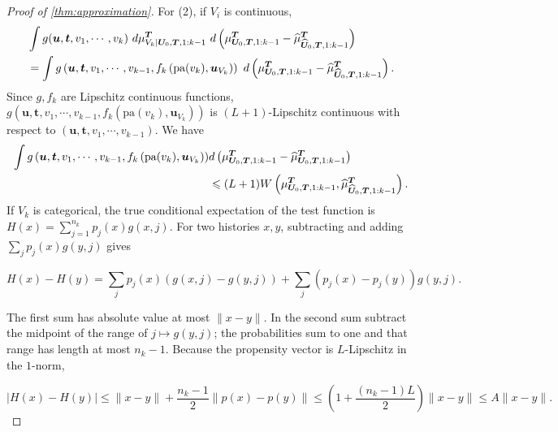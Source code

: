 \begin{proof}[Proof of \cref{thm:approximation}]
  For (2), if $V_i$ is continuous, 
  \begin{align}
   & \int g(\boldsymbol{u} ,\boldsymbol{t} ,v_{1} ,\cdots ,v_{k}) \ d\mu _{V_{k} |\boldsymbol{U}_0 ,\boldsymbol{T} ,1:k-1}^{\boldsymbol{T}} \ d\left( \mu _{\boldsymbol{U}_0 ,\boldsymbol{T} ,1:k-1}^{\boldsymbol{T}} -\hat{\mu }_{\hat{\boldsymbol{U}}_0 ,\boldsymbol{T} ,1:k-1}^{\boldsymbol{T}}\right)\notag\\
   & =\int g\left(\boldsymbol{u} ,\boldsymbol{t} ,v_{1} ,\cdots ,v_{k-1} ,{f}_{k}\left(\text{pa}( v_{k}) ,\boldsymbol{u}_{V_{k}}\right)\right) \ d\left( \mu _{\boldsymbol{U}_0 ,\boldsymbol{T} ,1:k-1}^{\boldsymbol{T}} -\hat{\mu }_{\hat{\boldsymbol{U}}_0 ,\boldsymbol{T} ,1:k-1}^{\boldsymbol{T}}\right) .\label{eq:approximation_2}
  \end{align}
  Since $ g,{f}_{k}$ are Lipschitz continuous functions, $ g\left(\boldsymbol{u} ,\boldsymbol{t} ,v_{1} ,\cdots ,v_{k-1} ,{f}_{k}\left(\text{pa}( v_{k}) ,\boldsymbol{u}_{V_{k}}\right)\right)$ is $(L+1)$-Lipschitz continuous with respect to $ (\boldsymbol{u} ,\boldsymbol{t} ,v_{1} ,\cdots ,v_{k-1}) $. We have 
  \begin{align}
  \int g\left(\boldsymbol{u} ,\boldsymbol{t} ,v_{1} ,\cdots ,v_{k-1} ,{f}_{k}\left(\text{pa}( v_{k}) ,\boldsymbol{u}_{V_{k}}\right)\right) & d\left( \mu _{\boldsymbol{U}_0 ,\boldsymbol{T} ,1:k-1}^{\boldsymbol{T}} -\hat{\mu }_{\boldsymbol{U}_0 ,\boldsymbol{T} ,1:k-1}^{\boldsymbol{T}}\right) \notag\\
  &\leqslant ( L+1) W\left( \mu _{\boldsymbol{U}_0 ,\boldsymbol{T} ,1:k-1}^{\boldsymbol{T}} ,\hat{\mu }_{\hat{\boldsymbol{U}}_0 ,\boldsymbol{T} ,1:k-1}^{\boldsymbol{T}}\right). \label{eq:approximation_3}
  \end{align}
If $V_k$ is categorical, the true conditional expectation of the test function is $H(x)=\sum_{j=1}^{n_k}p_j(x)g(x,j)$. For two histories $x,y$, subtracting and adding $\sum_jp_j(x)g(y,j)$ gives

\[
H(x)-H(y)=\sum_jp_j(x)(g(x,j)-g(y,j))+\sum_j(p_j(x)-p_j(y))g(y,j).
\]

The first sum has absolute value at most $\|x-y\|$. In the second sum subtract the midpoint of the range of $j\mapsto g(y,j)$; the probabilities sum to one and that range has length at most $n_k-1$. Because the propensity vector is $L$-Lipschitz in the $1$-norm,

\[
|H(x)-H(y)|\leqslant\|x-y\|+\frac{n_k-1}{2}\|p(x)-p(y)\|\leqslant\left(1+\frac{(n_k-1)L}{2}\right)\|x-y\|\leqslant A\|x-y\|.
\]


\end{proof}
